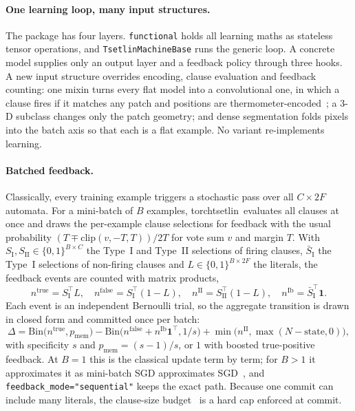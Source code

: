 \documentclass[twoside,11pt]{article}
\newcommand{\code}[1]{\texttt{#1}}
\newcommand{\lib}{\textsf{torchtsetlin}}
\begin{document}
\paragraph{One learning loop, many input structures.}
The package has four layers. \code{functional} holds all learning
maths as stateless tensor operations, and \code{TsetlinMachineBase} runs the generic loop. A concrete
model supplies only an output layer and a feedback policy through three hooks. A new input
structure overrides encoding, clause evaluation and feedback counting: one mixin turns every
flat model into a convolutional one, in which a clause fires if it matches any patch and
positions are thermometer-encoded~\citep{granmo2019convolutional}; a 3-D subclass changes only
the patch geometry; and dense segmentation folds pixels into the batch axis so that each is a
flat example. No variant re-implements learning.


\paragraph{Batched feedback.}
Classically, every training example triggers a stochastic pass over all $C\times 2F$ automata.
For a mini-batch of $B$ examples, \lib\ evaluates all clauses at once and draws the per-example
clause selections for feedback with the usual probability $(T \mp \mathrm{clip}(v,-T,T))/2T$
for vote sum $v$ and margin $T$. With $S_{\mathrm{I}}, S_{\mathrm{II}} \in \{0,1\}^{B\times C}$
the Type~I and Type~II selections of firing clauses, $\bar S_{\mathrm{I}}$ the Type~I selections
of non-firing clauses and $L \in \{0,1\}^{B\times 2F}$ the literals, the feedback events are
counted with matrix products,
\begin{equation*}
  n^{\mathrm{true}} = S_{\mathrm{I}}^{\top} L,\quad
  n^{\mathrm{false}} = S_{\mathrm{I}}^{\top} (1-L),\quad
  n^{\mathrm{II}} = S_{\mathrm{II}}^{\top} (1-L),\quad
  n^{\mathrm{Ib}} = \bar S_{\mathrm{I}}^{\top}\mathbf{1}.
\end{equation*}
Each event is an independent Bernoulli trial, so the aggregate transition is drawn in closed
form and committed once per batch:
\begin{equation*}
  \Delta = \mathrm{Bin}\bigl(n^{\mathrm{true}}, p_{\mathrm{mem}}\bigr)
  - \mathrm{Bin}\bigl(n^{\mathrm{false}} + n^{\mathrm{Ib}}\mathbf{1}^{\top}, 1/s\bigr)
  + \min\bigl(n^{\mathrm{II}}, \max(N - \mathrm{state}, 0)\bigr),
\end{equation*}
with specificity $s$ and $p_{\mathrm{mem}} = (s-1)/s$, or $1$ with boosted true-positive
feedback. At $B=1$ this is the classical update term by term; for $B>1$ it approximates it as
mini-batch SGD approximates SGD~\citep{bottou2018optimization}, and
\code{feedback\_mode="sequential"} keeps the exact path. Because one commit can include many
literals, the clause-size budget~\citep{abeyrathna2023clausesize} is a hard cap enforced at
commit.
\end{document}

